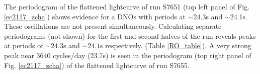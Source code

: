 



The periodogram of the flattened lightcurve of run S7651 (top left panel of Fig. \ref{ec2117_zcha}) shows evidence for a DNOs with periods at $\sim$24.3s and $\sim$24.1s. These oscillations are not present simultaneously. Calculating separate periodograms (not shown) for the first and second halves of the run reveals peaks at periods of $\sim24.3$s and $\sim24.1$s respectively.  (Table \ref{RO_table}). A very strong peak near 3640 cycles/day (23.7s) is seen in the periodogram (top right panel of Fig. \ref{ec2117_zcha}) of the flattened lightcurve of run S7655.







